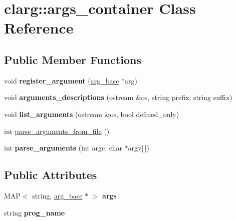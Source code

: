 \hypertarget{classclarg_1_1args__container}{}\section{clarg\+:\+:args\+\_\+container Class Reference}
\label{classclarg_1_1args__container}
\subsection*{Public Member Functions}
\begin{DoxyCompactItemize}
\item 
void {\bfseries register\+\_\+argument} (\hyperlink{classclarg_1_1arg__base}{arg\+\_\+base} $\ast$arg)\hypertarget{classclarg_1_1args__container_a24df956afe76b8f3377dbf622bcad957}{}\label{classclarg_1_1args__container_a24df956afe76b8f3377dbf622bcad957}

\item 
void {\bfseries arguments\+\_\+descriptions} (ostream \&os, string prefix, string suffix)\hypertarget{classclarg_1_1args__container_a0f081963267f4b66924633e29255dc3d}{}\label{classclarg_1_1args__container_a0f081963267f4b66924633e29255dc3d}

\item 
void {\bfseries list\+\_\+arguments} (ostream \&os, bool defined\+\_\+only)\hypertarget{classclarg_1_1args__container_ae2f55011dcec5e394b4fc7b5ce18ef4a}{}\label{classclarg_1_1args__container_ae2f55011dcec5e394b4fc7b5ce18ef4a}

\item 
int \hyperlink{classclarg_1_1args__container_a0d6feb51358dec2f5ba941ed837d1c1a}{parse\+\_\+arguments\+\_\+from\+\_\+file} ()
\item 
int {\bfseries parse\+\_\+arguments} (int argc, char $\ast$argv\mbox{[}$\,$\mbox{]})\hypertarget{classclarg_1_1args__container_a9bc7411d20a2b8fcfc0f720ddd8d401a}{}\label{classclarg_1_1args__container_a9bc7411d20a2b8fcfc0f720ddd8d401a}

\end{DoxyCompactItemize}
\subsection*{Public Attributes}
\begin{DoxyCompactItemize}
\item 
M\+AP$<$ string, \hyperlink{classclarg_1_1arg__base}{arg\+\_\+base} $\ast$ $>$ {\bfseries args}\hypertarget{classclarg_1_1args__container_ad194851fa063d34987575e0ee13d1c87}{}\label{classclarg_1_1args__container_ad194851fa063d34987575e0ee13d1c87}

\item 
string {\bfseries prog\+\_\+name}\hypertarget{classclarg_1_1args__container_a98f0ec6ac0e5fb595c6e0ec04a9770c8}{}\label{classclarg_1_1args__container_a98f0ec6ac0e5fb595c6e0ec04a9770c8}

\end{DoxyCompactItemize}


